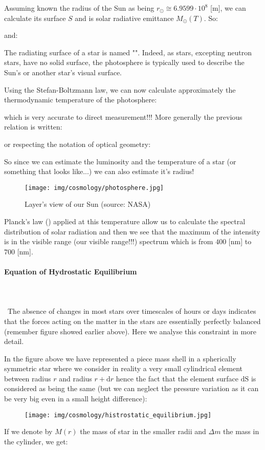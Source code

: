 	Assuming known the radius of the Sun as being $r_{\odot}\cong 6.9599\cdot 10^8$ [m], we can calculate its surface $S$ and is solar radiative emittance $M_{\odot}(T)$. So:
	
	and:
	
	\begin{tcolorbox}[title=Remark,colframe=black,arc=10pt]
	The radiating surface of a star is named "". Indeed, as stars, excepting neutron stars, have no solid surface, the photosphere is typically used to describe the Sun's or another star's visual surface.
	\end{tcolorbox}
	Using the Stefan-Boltzmann law, we can now calculate approximately the thermodynamic temperature of the photosphere:
	
	which is very accurate to direct measurement!!! More generally the previous relation is written:
	
	or respecting the notation of optical geometry:
	
	So since we can estimate the luminosity and the temperature of a star (or something that looks like...) we can also estimate it's radius!
	\begin{figure}[H]
		\centering
		\texttt{[image: img/cosmology/photosphere.jpg]}	
		\caption[Layer's view of our Sun]{Layer's view of our Sun (source: NASA)}
	\end{figure}

	Planck's law () applied at this temperature allow us to calculate the spectral distribution of solar radiation and then we see that the maximum of the intensity is in the visible range (our visible range!!!) spectrum which is from $400$ [nm] to $700$ [nm].
	
	\paragraph{Equation of Hydrostatic Equilibrium}\mbox{}\\\\\
	The absence of changes in most stars over timescales of hours or days indicates that the forces acting on the matter in the stars are essentially perfectly balanced (remember figure showed earlier above). Here we analyse this constraint in more detail.

	In the figure above we have represented a piece mass shell in a spherically symmetric star where we consider in reality a very small cylindrical element between radius $r$ and radius $r + \mathrm{d}r$ hence the fact that the element surface $\mathrm{dS}$ is considered as being the same (but we can neglect the pressure variation as it can be very big even in a small height difference):
	\begin{figure}[H]
		\centering
		\texttt{[image: img/cosmology/histrostatic\_equilibrium.jpg]}	
	\end{figure}
	If we denote by $M(r)$ the mass of star in the smaller radii and $\Delta m$ the mass in the cylinder, we get:
	
